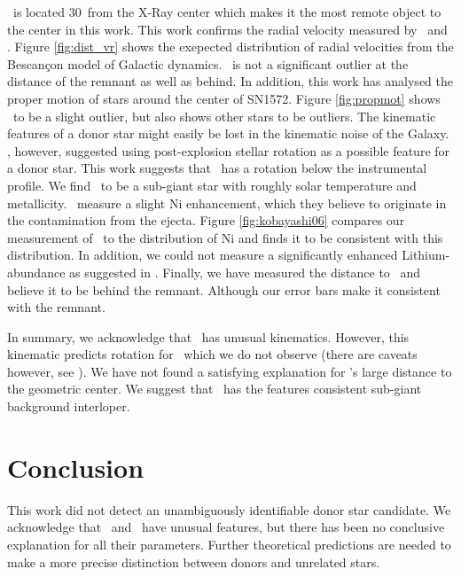\starg\ is located 30\arcsec\ from the X-Ray center which makes it the most remote object to the center in this work. This work confirms the radial velocity measured by \gh\ and \wek. Figure \ref{fig:dist_vr} shows the exepected distribution of radial velocities from the Bescan\c{c}on model of Galactic dynamics. \starg\ is not a significant outlier at the distance of the remnant as well as behind. 
In addition, this work has analysed the proper motion of stars around the center of SN1572. Figure \ref{fig:propmot} shows \starg\ to be a slight outlier, but also shows other stars to be outliers.
The kinematic features of a donor star might easily be lost in the kinematic noise of the Galaxy. \wek, however, suggested using post-explosion stellar rotation as a possible feature for a donor star. This work suggests that \starg\ has a rotation below the instrumental profile. 
We find \starg\ to be a sub-giant star with roughly solar temperature and metallicity.
\gh\ measure a slight Ni enhancement, which they believe to originate in the contamination from the ejecta. Figure \ref{fig:kobayashi06} compares our measurement of \starg\ to the distribution of Ni and finds it to be consistent with this distribution. In addition, we could not measure a significantly enhanced Lithium-abundance as suggested in \gh. 
Finally, we have measured the distance to \starg\ and believe it to be behind the remnant. Although our error bars make it consistent with the remnant.

In summary, we acknowledge that \starg\ has unusual kinematics. However, this kinematic predicts rotation for \starg\ which we do not observe (there are caveats however, see \wek). We have not  found a satisfying explanation for \starg's large distance to the geometric center. We suggest that \starg\, has the features consistent sub-giant background interloper.

\section{Conclusion}
\label{sec:conclusion}
This work did not detect an unambiguously identifiable donor star candidate. We acknowledge that \starb\ and \starg\ have unusual features, but there has been no conclusive explanation for all their parameters. Further theoretical predictions are needed to make a more precise distinction between donors and unrelated stars. 
 
